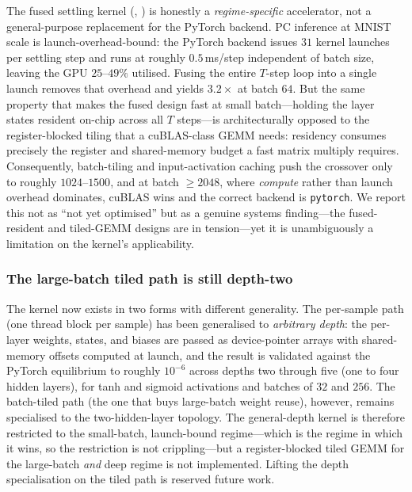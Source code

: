 The fused settling kernel (, ) is honestly a
\emph{regime-specific} accelerator, not a general-purpose replacement for the
PyTorch backend. PC inference at MNIST scale is launch-overhead-bound: the PyTorch
backend issues $31$ kernel launches per settling step and runs at roughly
$0.5$\,ms/step independent of batch size, leaving the GPU $25$--$49\%$ utilised.
Fusing the entire $T$-step loop into a single launch removes that overhead and
yields $3.2\times$ at batch $64$. But the same property that makes the fused design
fast at small batch---holding the layer states resident on-chip across all $T$
steps---is architecturally opposed to the register-blocked tiling that a
cuBLAS-class GEMM needs: residency consumes precisely the register and shared-memory
budget a fast matrix multiply requires. Consequently, batch-tiling and
input-activation caching push the crossover only to roughly $1024$--$1500$, and at
batch $\geq 2048$, where \emph{compute} rather than launch overhead dominates, cuBLAS
wins and the correct backend is \texttt{pytorch}. We report this not as ``not yet
optimised'' but as a genuine systems finding---the fused-resident and tiled-GEMM
designs are in tension---yet it is unambiguously a limitation on the kernel's
applicability.

\subsubsection{The large-batch tiled path is still depth-two}

The kernel now exists in two forms with different generality. The per-sample path
(one thread block per sample) has been generalised to \emph{arbitrary depth}: the
per-layer weights, states, and biases are passed as device-pointer arrays with
shared-memory offsets computed at launch, and the result is validated against the
PyTorch equilibrium to roughly $10^{-6}$ across depths two through five (one to four
hidden layers), for tanh and sigmoid activations and batches of $32$ and $256$. The
batch-tiled path (the one that buys large-batch weight reuse), however, remains
specialised to the two-hidden-layer topology. The general-depth kernel is therefore
restricted to the small-batch, launch-bound regime---which is the regime in which it
wins, so the restriction is not crippling---but a register-blocked tiled GEMM for the
large-batch \emph{and} deep regime is not implemented. Lifting the depth
specialisation on the tiled path is reserved future work.

